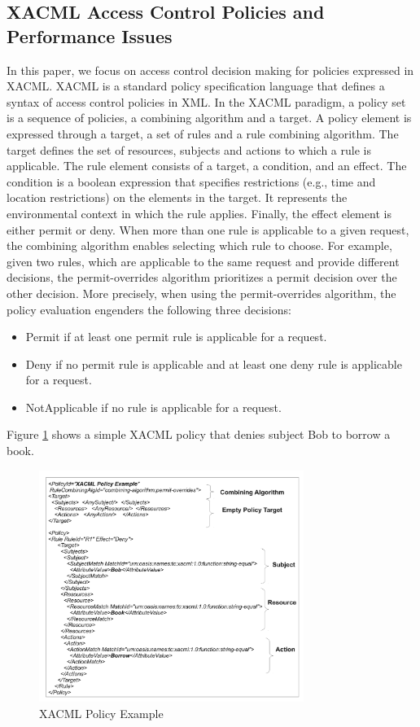 \subsection{XACML Access Control Policies and Performance Issues}
In this paper, we focus on access control decision making for policies expressed in XACML.
XACML \cite{sunxacml} is a standard policy specification language that defines a syntax of access control policies in XML.
In the XACML paradigm, a policy set is a sequence of policies, a combining algorithm and
 a target. A policy element is expressed through a target, a set of rules and a rule combining algorithm. 
The target defines the set of resources, subjects and actions to which a rule is applicable. The rule element consists of a 
target, a condition, and an effect. The condition is a boolean expression that specifies restrictions (e.g., time and location restrictions)
 on the elements in the target. It represents 
the environmental context in which the rule applies. Finally, the effect element is either permit or deny. 
When more than one rule is applicable to a given request, the combining algorithm enables selecting which rule to choose.
For example, given two rules, which are applicable to the same request and provide different decisions,
the permit-overrides algorithm prioritizes a permit decision over the other decision.
More precisely, when using the permit-overrides algorithm, the policy evaluation engenders the following three decisions: 
\begin{itemize}
\item Permit if at least one permit rule is applicable for a request.
\item Deny if no permit rule is applicable and at least one deny rule is applicable for a request.
\item NotApplicable if no rule is applicable for a request.
\end{itemize}

Figure \ref{figur1} shows a simple XACML policy that denies subject Bob to borrow a book.
\fontsize{5}{5}
\begin{figure}[!h]
\begin{center}
\includegraphics[width=8.6cm]{xacml}
\caption{XACML Policy Example}
\label{figur1}
\end{center}
\end{figure}

